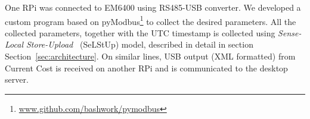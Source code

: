 \documentclass[10pt]{sensys-proc}
\newcommand{\secref}[1]{Section~\ref{#1}}
\newcommand{\tabref}[1]{Table~\ref{#1}}
\newcommand{\selstup}{SeLStUp}
\newcommand{\paradigms}{Sense-Local Store-Upload~}
\begin{document}
 One RPi was connected to EM6400 using RS485-USB converter. We developed a custom program based on pyModbus\footnote{\url{www.github.com/bashwork/pymodbus}} to collect the desired parameters. %
All the collected parameters, together with the UTC timestamp is %
collected using \emph{\paradigms} (\selstup) model, described in detail in section \secref{sec:architecture}. On similar lines, USB output (XML formatted) from Current Cost is received on another RPi and is communicated to the desktop server. %

\end{document}
